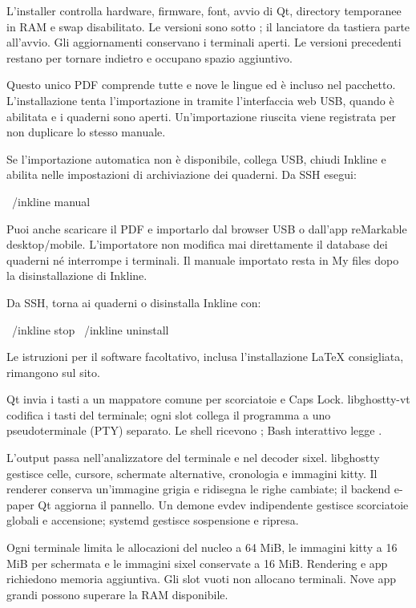 L'installer controlla hardware, firmware, font, avvio di Qt, directory
temporanee in RAM e swap disabilitato. Le versioni sono sotto
; il lanciatore da tastiera parte all'avvio.
Gli aggiornamenti conservano i terminali aperti.  Le versioni precedenti restano per tornare indietro
e occupano spazio aggiuntivo.

Questo unico PDF comprende tutte e nove le lingue ed è incluso nel pacchetto.
L'installazione tenta l'importazione in  tramite l'interfaccia
web USB, quando è abilitata e i quaderni sono aperti. Un'importazione riuscita
viene registrata per non duplicare lo stesso manuale.

Se l'importazione automatica non è disponibile, collega USB, chiudi Inkline
e abilita  nelle impostazioni di archiviazione dei quaderni.
Da SSH esegui:
\begin{shell}
~/inkline manual
\end{shell}
Puoi anche scaricare il PDF e importarlo dal browser USB o dall'app reMarkable
desktop/mobile. L'importatore non modifica mai direttamente il database dei
quaderni né interrompe i terminali. Il manuale importato resta in My files
dopo la disinstallazione di Inkline.

Da SSH, torna ai quaderni o disinstalla Inkline con:
\begin{shell}
~/inkline stop
~/inkline uninstall
\end{shell}
Le istruzioni per il software facoltativo, inclusa l'installazione LaTeX
consigliata, rimangono sul sito.

Qt invia i tasti a un mappatore comune per scorciatoie e Caps Lock.
libghostty-vt codifica i tasti del terminale; ogni slot collega il programma
a uno pseudoterminale (PTY) separato. Le shell ricevono
; Bash interattivo legge .

L'output passa nell'analizzatore del terminale e nel decoder sixel. libghostty
gestisce celle, cursore, schermate alternative, cronologia e immagini kitty.
Il renderer conserva un'immagine grigia e ridisegna le righe cambiate; il backend
e-paper Qt aggiorna il pannello. Un demone evdev indipendente gestisce scorciatoie
globali e accensione; systemd gestisce sospensione e ripresa.

Ogni terminale limita le allocazioni del nucleo a 64 MiB, le immagini kitty
a 16 MiB per schermata e le immagini sixel conservate a 16 MiB. Rendering e
app richiedono memoria aggiuntiva. Gli slot vuoti non allocano terminali.
Nove app grandi possono superare la RAM disponibile.

